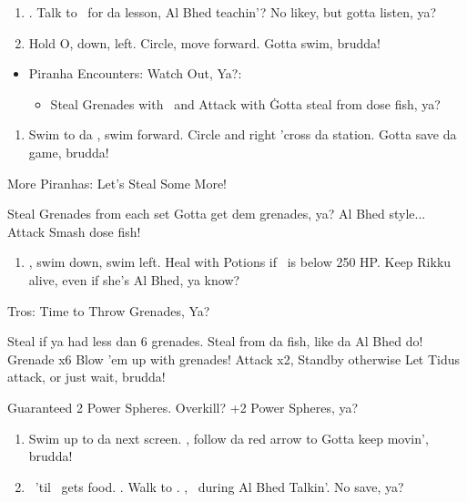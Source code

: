 \begin{enumerate}[resume]
    \item \cs[2:30]. Talk to \rikku\ for da lesson, \sd Al Bhed teachin'? No likey, but gotta listen, ya?
    \item Hold O, down, left. Circle, move forward. Gotta swim, brudda!
\end{enumerate}
\begin{encounters}
    \begin{itemize}
        \item Piranha Encounters: Watch Out, Ya?:
        \begin{itemize}
            \item Steal Grenades with \rikku\ and Attack with \tidus\. Gotta steal from dose fish, ya?
        \end{itemize}
    \end{itemize}
\end{encounters}
\begin{enumerate}[resume]
    \item Swim to da \save, swim forward. Circle and right 'cross da station. Gotta save da game, brudda!
\end{enumerate}
\begin{battle}{More Piranhas: Let's Steal Some More!}
    \begin{itemize}
        \rikkuf Steal Grenades from each set Gotta get dem grenades, ya? Al Bhed style...
        \tidusf Attack Smash dose fish!
    \end{itemize}
\end{battle}
\begin{enumerate}[resume]
    \item \cs, swim down, swim left. Heal with Potions if \rikku\ is below 250 HP. Keep Rikku alive, even if she's Al Bhed, ya know?
\end{enumerate}
\begin{battle}[2200]{Tros: Time to Throw Grenades, Ya?}
    \begin{itemize}
        \rikkuf Steal if ya had less dan 6 grenades. Steal from da fish, like da Al Bhed do!
        \rikkuf Grenade x6 Blow 'em up with grenades!
        \tidusf Attack x2, Standby otherwise Let Tidus attack, or just wait, brudda!
    \end{itemize}
    Guaranteed 2 Power Spheres. Overkill? +2 Power Spheres, ya?
\end{battle}
\begin{enumerate}[resume]
    \item Swim up to da next screen. \cs, follow da red arrow to \cs[0:50] Gotta keep movin', brudda!
    \item \sd\ 'til \tidus\ gets food. \cs[3:00]. Walk to \rikku. \cs[2:30], \sd\ during Al Bhed Talkin'. No save, ya?
\end{enumerate}
